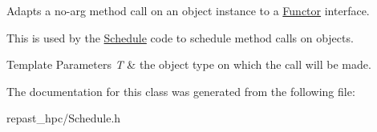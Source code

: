 Adapts a no-\/arg method call on an object instance to a \hyperlink{classrepast_1_1_functor}{Functor} interface. 

This is used by the \hyperlink{classrepast_1_1_schedule}{Schedule} code to schedule method calls on objects.


\begin{DoxyTemplParams}{Template Parameters}
{\em T} & the object type on which the call will be made. \\
\hline
\end{DoxyTemplParams}


The documentation for this class was generated from the following file\-:\begin{DoxyCompactItemize}
\item 
repast\-\_\-hpc/Schedule.\-h\end{DoxyCompactItemize}
